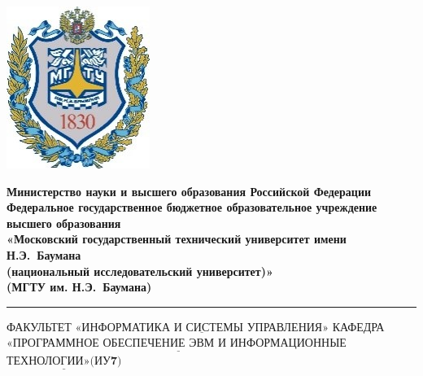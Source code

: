 \documentclass[12pt,a4paper,oneside]{report}
\begin{document}
\thispagestyle{empty}
\noindent \begin{minipage}{0.15\textwidth}
	\includegraphics[width=\linewidth]{b_logo}
\end{minipage}
\noindent\begin{minipage}{0.9\textwidth}\centering
	\textbf{Министерство науки и высшего образования Российской Федерации}\\
	\textbf{Федеральное государственное бюджетное образовательное учреждение высшего образования}\\
	\textbf{«Московский государственный технический университет имени Н.Э.~Баумана}\\
	\textbf{(национальный исследовательский университет)»}\\
	\textbf{(МГТУ им. Н.Э.~Баумана)}
\end{minipage}
\noindent\rule{18cm}{3pt}
\newline\newline
\noindent ФАКУЛЬТЕТ $\underline{\textbf{«ИНФОРМАТИКА И СИСТЕМЫ УПРАВЛЕНИЯ»}}$ \newline\newline
\noindent КАФЕДРА $\underline{\textbf{«ПРОГРАММНОЕ ОБЕСПЕЧЕНИЕ ЭВМ И ИНФОРМАЦИОННЫЕ }}$\newline\newline $\underline{\textbf{ТЕХНОЛОГИИ»(ИУ7)}}$\newline\newline
\end{document}
